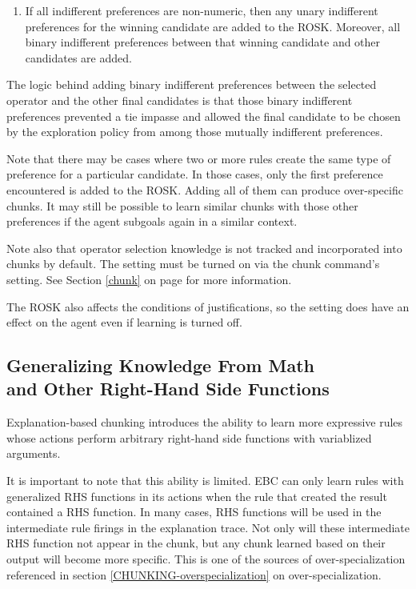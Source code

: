 \begin{description}
\begin{enumerate}
		\item If all indifferent preferences are non-numeric, then any unary indifferent preferences for the winning candidate are added to the ROSK. Moreover, all binary indifferent preferences between that winning candidate and other candidates are added.
	\end{enumerate}
	The logic behind adding binary indifferent preferences between the selected operator and the other final candidates is that those binary indifferent preferences prevented a tie impasse and allowed the final candidate to be chosen by the exploration policy from among those mutually indifferent preferences.
\end{description}

Note that there may be cases where two or more rules create the same type of preference for a particular candidate. In those cases, only the first preference encountered is added to the ROSK. Adding all of them can produce over-specific chunks. It may still be possible to learn similar chunks with those other preferences if the agent subgoals again in a similar context.

Note also that operator selection knowledge is not tracked and incorporated into chunks by default. The setting must be turned on via the chunk command's  setting. See Section \ref{chunk} on page \pageref{chunk} for more information. 

The ROSK also affects the conditions of justifications, so the  setting does have an effect on the agent even if learning is turned off.

\subsection{Generalizing Knowledge From Math \\ and Other Right-Hand Side Functions}
\label{CHUNKING-rhs-functions}

Explanation-based chunking introduces the ability to learn more expressive rules whose actions perform arbitrary right-hand side functions with variablized arguments.  

It is important to note that this ability is limited.  EBC can only learn rules with generalized RHS functions in its actions when the rule that created the result contained a RHS function.  In many cases, RHS functions will be used in the intermediate rule firings in the explanation trace.  Not only will these intermediate RHS function not appear in the chunk, but any chunk learned based on their output will become more specific.  This is one of the sources of over-specialization referenced in section \ref{CHUNKING-overspecialization} on over-specialization.
 
